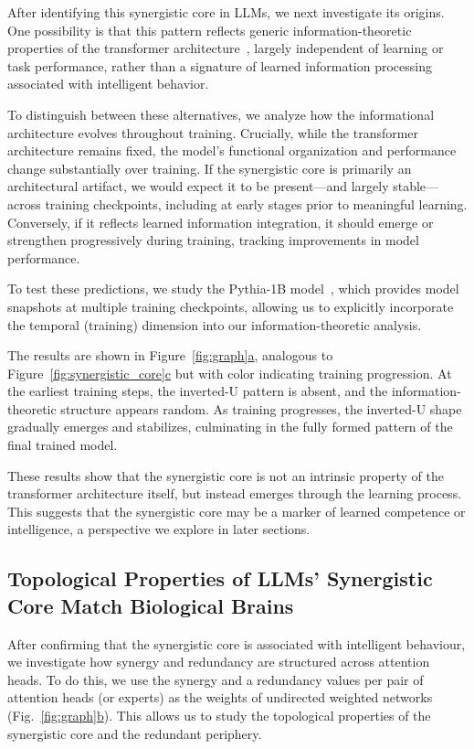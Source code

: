 \documentclass[11pt,a4paper]{ouparticle}
\newcommand\figsubref[2]{\hyperref[#1]{\ref*{#1}#2}}
\begin{document}
After identifying this synergistic core in LLMs, we next investigate its origins. One possibility is that this pattern reflects generic information-theoretic properties of the transformer architecture~\cite{vaswani2017attention}, largely independent of learning or task performance, rather than a signature of learned information processing associated with intelligent behavior.

To distinguish between these alternatives, we analyze how the informational architecture evolves throughout training. Crucially, while the transformer architecture remains fixed, the model’s functional organization and performance change substantially over training. If the synergistic core is primarily an architectural artifact, we would expect it to be present—and largely stable—across training checkpoints, including at early stages prior to meaningful learning. Conversely, if it reflects learned information integration, it should emerge or strengthen progressively during training, tracking improvements in model performance.

To test these predictions, we study the Pythia-1B model~\cite{biderman2023pythia}, which provides model snapshots at multiple training checkpoints, allowing us to explicitly incorporate the temporal (training) dimension into our information-theoretic analysis.

The results are shown in Figure~\figsubref{fig:graph}{a}, analogous to Figure~\figsubref{fig:synergistic_core}{c} but with color indicating training progression. At the earliest training steps, the inverted-U pattern is absent, and the information-theoretic structure appears random. As training progresses, the inverted-U shape gradually emerges and stabilizes, culminating in the fully formed pattern of the final trained model.

These results show that the synergistic core is not an intrinsic property of the transformer architecture itself, but instead emerges through the learning process. This suggests that the synergistic core may be a marker of learned competence or intelligence, a perspective we explore in later sections.


\subsection*{Topological Properties of LLMs' Synergistic Core Match Biological Brains}

After confirming that the synergistic core is associated with intelligent behaviour, we investigate how synergy and redundancy are structured across attention heads. 
To do this, we use the synergy and a redundancy values per pair of attention heads (or experts) as the weights of undirected weighted networks (Fig.~\figsubref{fig:graph}{b}). This allows us to study the topological properties of the synergistic core and the redundant periphery.
\end{document}
